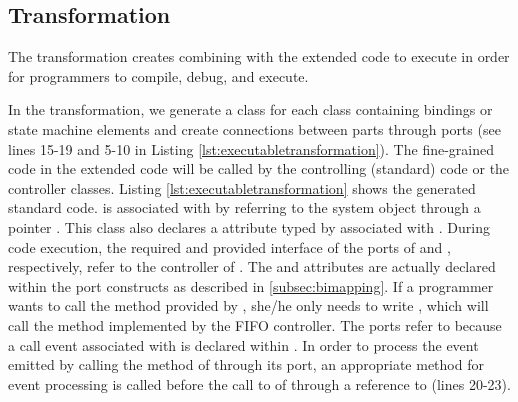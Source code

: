 \subsection{Transformation}
\label{subsec:compilation}
The transformation creates  combining with the extended code to execute in order for programmers to compile, debug, and execute. 



 

In the transformation, we generate a  class for each class containing bindings or state machine elements and create connections between parts through ports (see lines 15-19 and 5-10 in Listing \ref{lst:executabletransformation}).
The fine-grained code in the extended code will be called by the controlling (standard) code or the controller classes.
Listing \ref{lst:executabletransformation} shows the generated standard code.
 is associated with  by referring to the system object through a pointer . 
This class also declares a  attribute typed by  associated with .
During code execution, the required and provided interface of the  ports of  and , respectively, refer to the controller of .
The  and  attributes are actually declared within the port constructs as described in \ref{subsec:bimapping}.
If a programmer wants to call the  method provided by , she/he only needs to write , which will call the  method implemented by the FIFO controller.
The  ports refer to  because a call event associated with  is declared within . 
In order to process the event emitted by calling the  method of  through its  port, an appropriate method for event processing is called before the call to  of  through a reference to  (lines 20-23).

